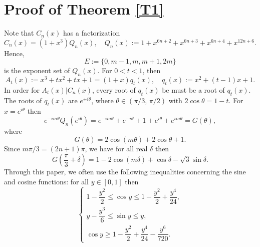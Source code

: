 \documentclass[a4paper,12pt,english,reqno]{amsart}
\theoremstyle{definition}
\theoremstyle{remark}
\begin{document}
\section{Proof of Theorem \ref{T1}}
Note that $C_n(x)$ has a factorization
\[
C_n(x)=(1+x^3)Q_n(x),\quad Q_n(x):=1+x^{6n+2}+x^{6n+3}+x^{6n+4}+x^{12n+6}.
\]
Hence, \[E:=\{0,m-1,m,m+1,2m\}\]
 is the exponent set of $Q_n(x)$. 
For $0<t<1$, then \[A_t(x):=x^3+tx^2+tx+1=(1+x)q_t(x),\quad q_t(x):=x^2+(t-1)x+1.\]
In order for $A_t(x)|C_n(x)$, every root of $q_t(x)$ be must be a root of $q_t(x)$. 
The roots of $q_t(x)$ are $e^{\pm i\theta}$, where $\theta\in (\pi/3,\,\pi/2)$ with $2\cos \theta=1-t$. For $x=e^{i\theta}$ then \begin{equation}\label{E5}
e^{-im\theta}Q_n(e^{i\theta})=e^{-im\theta}+e^{-i\theta}+1+e^{i\theta}+e^{im\theta}=G(\theta),
\end{equation}
where \[
G(\theta)=2\cos(m\theta)+2\cos \theta+1.
\]
Since $m\pi/3=(2n+1)\pi$, we have for all real $\delta$ then \begin{equation}\label{E6}
G(\dfrac{\pi}{3}+\delta)=1-2\cos(m\delta)+\cos\delta-\sqrt{3}\sin\delta.
\end{equation}
Through this paper, we often use the following inequalities concerning the sine and cosine functions: for all $y\in [0,1]$ then 
\begin{equation}\label{ineq}
\begin{cases}
1-\dfrac{y^2}{2}\leq\cos y\leq 1-\dfrac{y^2}{2}+\dfrac{y^4}{24},\\
y-\dfrac{y^3}{6}\leq \sin y\leq y,\\
\cos y\geq 1-\dfrac{y^2}{2}+\dfrac{y^4}{24}-\dfrac{y^6}{720}.
\end{cases}
\end{equation}
\end{document}
